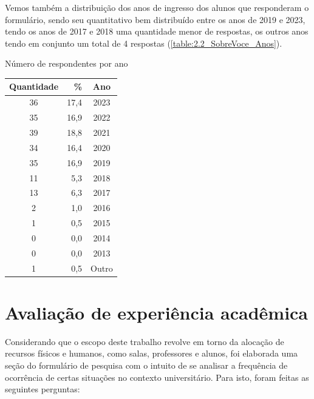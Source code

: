 \begin{apendicesenv}
  Vemos também a distribuição dos anos de ingresso dos alunos que responderam o formulário, sendo seu quantitativo bem distribuído entre os anos de 2019 e 2023, tendo os anos de 2017 e 2018 uma quantidade menor de respostas, os outros anos tendo em conjunto um total de 4 respostas (\autoref{table:2.2_SobreVoce_Anos}).

  \begin{CenteredTable} \caption{Número de respondentes por ano} \label{table:2.2_SobreVoce_Anos}
    \begin{tabular}{| c r c |}
      \hline
      \textbf{Quantidade} & \%   & \textbf{Ano} \\
      \hline
      36                  & 17,4 & 2023         \\
      35                  & 16,9 & 2022         \\
      39                  & 18,8 & 2021         \\
      34                  & 16,4 & 2020         \\
      35                  & 16,9 & 2019         \\
      11                  & 5,3  & 2018         \\
      13                  & 6,3  & 2017         \\
      2                   & 1,0  & 2016         \\
      1                   & 0,5  & 2015         \\
      0                   & 0,0  & 2014         \\
      0                   & 0,0  & 2013         \\
      1                   & 0,5  & Outro        \\
      \hline
    \end{tabular}
  \end{CenteredTable}

  \section*{Avaliação de experiência acadêmica} \label{sec:Avaliação de experiência acadêmica}

  Considerando que o escopo deste trabalho revolve em torno da alocação de recursos físicos e humanos, como salas, professores e alunos, foi elaborada uma seção do formulário de pesquisa com o intuito de se analisar a frequência de ocorrência de certas situações no contexto universitário. Para isto, foram feitas as seguintes perguntas:


\end{apendicesenv}
